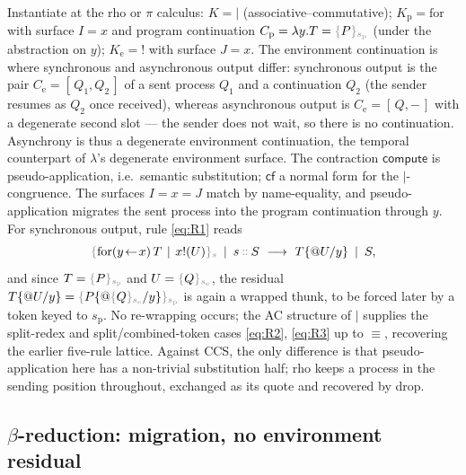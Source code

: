 \documentclass[11pt]{article}
\makeatletter
\theoremstyle{definition}
\theoremstyle{plain}
\newcommand{\dec}[1]{\textcolor{costgray}{#1}}   %
\newcommand{\sgn}[2]{\dec{\{}{#1}\dec{\}_{#2}}}  %
\newcommand{\cons}{\mathbin{\dec{\dblcolon}}}  %
\newcommand{\red}{\longrightarrow}
\newcommand{\Seq}{\equiv}
\newcommand{\quot}[1]{@#1}
\newcommand{\subst}[3]{#1\{#2/#3\}}
\newcommand{\compute}{\mathsf{compute}}
\newcommand{\cf}{\mathsf{cf}}
\newcommand{\Kp}{K_{\mathrm{p}}}
\newcommand{\Ke}{K_{\mathrm{e}}}
\newcommand{\Par}{\mathbin{|}}
\makeatother
\begin{document}
Instantiate at the rho or $\pi$ calculus: $K = {\Par}$
(associative--commutative);
$\Kp = \mathrm{for}$ with surface $I = x$ and program continuation
$C_{\mathrm p} = \lambda y.T = \sgn{P}{s_{\mathrm p}}$ (under the abstraction
on $y$);
$\Ke = {!}$ with surface $J = x$. The environment continuation is where
synchronous and asynchronous output differ: synchronous output is the
pair $C_{\mathrm e} = [\,Q_1, Q_2\,]$ of a sent process $Q_1$ and a
continuation $Q_2$ (the sender resumes as $Q_2$ once received), whereas
asynchronous output is $C_{\mathrm e} = [\,Q, {-}\,]$ with a degenerate
second slot --- the sender does not wait, so there is no continuation.
Asynchrony is thus a degenerate environment continuation, the temporal
counterpart of $\lambda$'s degenerate environment surface.
The contraction $\compute$ is pseudo-application, i.e.\ semantic
substitution; $\cf$ a normal form for the $\Par$-congruence. The surfaces
$I = x = J$ match by name-equality, and pseudo-application migrates the
sent process into the program continuation through $y$. For synchronous
output, rule \eqref{eq:R1} reads
%
\[
  \sgn{\mathrm{for}(y\!\leftarrow\! x)\,T \,\Par\, x!(U)}{s}
  \;\Par\; s\cons S
  \ \red\
  \subst{T}{\quot{U}}{y} \;\Par\; S,
\]
%
and since $T = \sgn{P}{s_{\mathrm p}}$ and $U = \sgn{Q}{s_{\mathrm e}}$,
the residual $\subst{T}{\quot{U}}{y} =
\sgn{\subst{P}{\quot{\sgn{Q}{s_{\mathrm e}}}}{y}}{s_{\mathrm p}}$ is again
a wrapped thunk, to be forced later by a token keyed to $s_{\mathrm p}$.
No re-wrapping occurs; the AC structure of $\Par$ supplies the split-redex
and split/combined-token cases \eqref{eq:R2}, \eqref{eq:R3} up to $\Seq$,
recovering the earlier five-rule lattice. Against CCS, the only difference
is that pseudo-application here has a non-trivial substitution half;
rho keeps a process in the sending position throughout, exchanged as its
quote and recovered by drop.

\subsection{\texorpdfstring{$\beta$}{beta}-reduction: migration, no environment residual}
\end{document}
